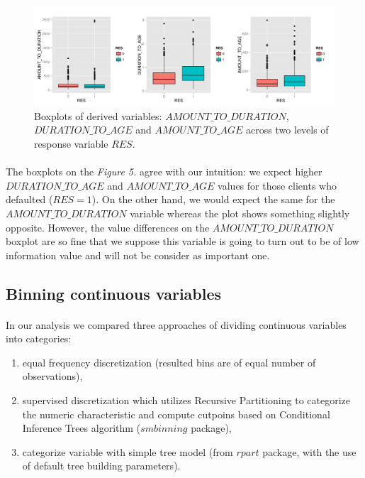 \documentclass[10pt]{article}\usepackage[]{graphicx}\usepackage[]{color}
\newenvironment{knitrout}{}{} %
\begin{document}
\begin{figure}[h!]
\centering
\begin{knitrout}
\color{fgcolor}
\includegraphics[width=.99\linewidth]{figure/unnamed-chunk-7-1} 

\end{knitrout}
\caption{Boxplots of derived variables: $AMOUNT\_TO\_DURATION$, $DURATION\_TO\_AGE$ and $AMOUNT\_TO\_AGE$ across two levels of response variable $RES$.}
\end{figure}

\paragraph{}
The boxplots on the \textit{Figure 5.} agree with our intuition: we expect higher $DURATION\_TO\_AGE$ and $AMOUNT\_TO\_AGE$ values for those clients who defaulted ($RES=1$). On the other hand, we would expect the same for the $AMOUNT\_TO\_DURATION$ variable whereas the plot shows something slightly opposite. However, the value differences on the $AMOUNT\_TO\_DURATION$ boxplot are so fine that we suppose this variable is going to turn out to be of low information value and will not be consider as important one. 

\subsection{Binning continuous variables}
\paragraph{}
In our analysis we compared three approaches of dividing continuous variables into categories: 
\begin{enumerate}
\item equal frequency discretization (resulted bins are of equal number of observations),
\item supervised discretization which utilizes Recursive Partitioning to categorize the numeric characteristic and compute cutpoins based on Conditional Inference Trees algorithm ($smbinning$ package),
\item categorize variable with simple tree model (from $rpart$ package, with the use of default tree building parameters).
\end{enumerate}
\end{document}
